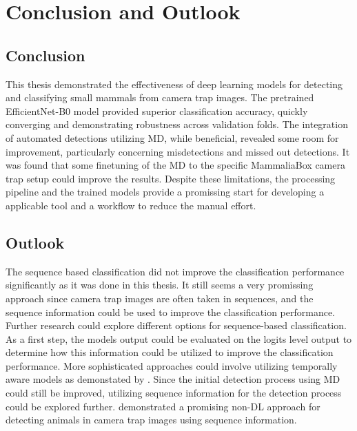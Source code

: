 


\section{Conclusion and Outlook}
\label{conclusion_outlook}

\subsection{Conclusion}

This thesis demonstrated the effectiveness of deep learning models for detecting and classifying small mammals from camera trap images.
The pretrained EfficientNet-B0 model provided superior classification accuracy, quickly converging and demonstrating robustness across validation folds.
The integration of automated detections utilizing \ac{MD}, while beneficial, revealed some room for improvement, particularly concerning misdetections and missed out detections.
It was found that some finetuning of the \ac{MD} to the specific MammaliaBox camera trap setup could improve the results.
Despite these limitations, the processing pipeline and the trained models provide a promissing start for developing a applicable tool and a workflow to reduce the manual effort.


\subsection{Outlook}
The sequence based classification did not improve the classification performance significantly as it was done in this thesis.
It still seems a very promissing approach since camera trap images are often taken in sequences, and the sequence information could be used to improve the classification performance.
Further research could explore different options for sequence-based classification.
As a first step, the models output could be evaluated on the logits level output to determine how this information could be utilized to improve the classification performance.
More sophisticated approaches could involve utilizing temporally aware models as demonstated by \textcite{muhammadTemporalSwinFPNNetNovel2024}.
Since the initial detection process using \ac{MD} could still be improved, utilizing sequence information for the detection process could be explored further.
\textcite{zotinANIMALDETECTIONUSING2019} demonstrated a promising non-\ac{DL} approach for detecting animals in camera trap images using sequence information.

